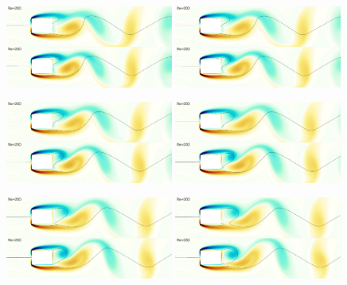\begin{figure}
  \centering
  \includegraphics[width=0.49\textwidth]{./fig/AR1p5/snap/snap.0000.png}
  \includegraphics[width=0.49\textwidth]{./fig/AR1p5/snap/snap.0005.png}
  \includegraphics[width=0.49\textwidth]{./fig/AR1p5/snap/snap.0010.png}
  \includegraphics[width=0.49\textwidth]{./fig/AR1p5/snap/snap.0015.png}
  \includegraphics[width=0.49\textwidth]{./fig/AR1p5/snap/snap.0020.png}
  \includegraphics[width=0.49\textwidth]{./fig/AR1p5/snap/snap.0025.png}

\end{figure}
